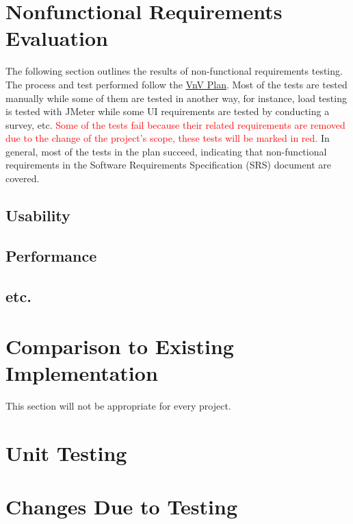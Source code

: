 \documentclass[12pt, titlepage]{article}
\begin{document}
\section{Nonfunctional Requirements Evaluation}
The following section outlines the results of non-functional requirements testing. The process and test performed follow the \href{https://github.com/beatlepie/4G06CapstoneProjectTeam2/blob/main/docs/VnVPlan/VnVPlan.pdf}{VnV Plan}. Most of the tests are tested manually while some of them are tested in another way, for instance, load testing is tested with JMeter while some UI requirements are tested by conducting a survey, etc. \textcolor{red}{Some of the tests fail because their related requirements are removed due to the change of the project's scope, these tests will be marked in red.} In general, most of the tests in the plan succeed, indicating that non-functional requirements in the Software Requirements Specification (SRS) document are covered.
\subsection{Usability}
		
\subsection{Performance}

\subsection{etc.}
	
\section{Comparison to Existing Implementation}	

This section will not be appropriate for every project.

\section{Unit Testing}

\section{Changes Due to Testing}

\end{document}
